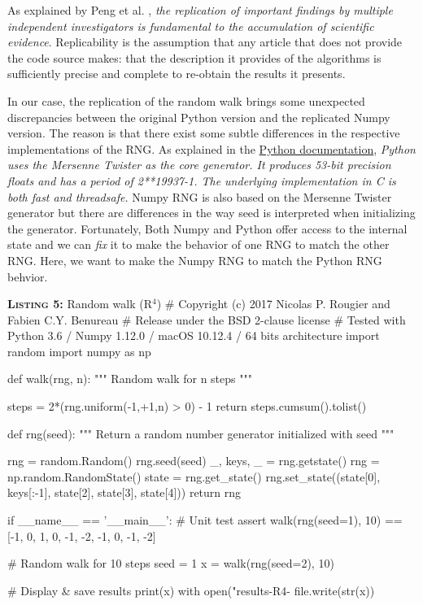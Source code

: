 As explained by Peng et al. \cite{Peng:2006}, {\em the replication of important findings by multiple independent investigators is fundamental to the accumulation of scientific evidence}. Replicability is the assumption that any article that does not provide the code source makes: that the description it provides of the algorithms is sufficiently precise and complete to re-obtain the results it presents.

In our case, the replication of the random walk brings some unexpected discrepancies between the original Python version and the replicated Numpy version.
The reason is that there exist some subtle differences in the respective implementations of the RNG.
As explained in the \href{https://docs.python.org/3.6/library/random.html}{Python documentation}, {\em Python uses the Mersenne Twister as the core generator. It produces 53-bit precision floats
and has a period of 2**19937-1.
The underlying implementation in C is both fast and threadsafe.}
Numpy RNG is also based on the Mersenne Twister generator but there are differences in the way seed is interpreted when initializing the generator.
Fortunately, Both Numpy and Python offer access to the internal state and we can {\em fix} it to make the behavior of one RNG to match the other RNG.
Here, we want to make the Numpy RNG to match the Python RNG behvior.

\begin{code}{\textbf{\textsc{Listing 5:}} Random walk (R$^4$)}
# Copyright (c) 2017 Nicolas P. Rougier and Fabien C.Y. Benureau
# Release under the BSD 2-clause license
# Tested with Python 3.6 / Numpy 1.12.0 / macOS 10.12.4 / 64 bits architecture
import random
import numpy as np

def walk(rng, n):
    """ Random walk for n steps """

    steps = 2*(rng.uniform(-1,+1,n) > 0) - 1
    return steps.cumsum().tolist()

def rng(seed):
    """ Return a random number generator initialized with seed """ 
    
    rng = random.Random()
    rng.seed(seed)
    _, keys, _ = rng.getstate()
    rng = np.random.RandomState()
    state = rng.get_state()
    rng.set_state((state[0], keys[:-1], state[2], state[3], state[4]))
    return rng

if __name__ == '__main__':
    # Unit test
    assert walk(rng(seed=1), 10) == [-1, 0, 1, 0, -1, -2, -1, 0, -1, -2]

    # Random walk for 10 steps
    seed = 1
    x = walk(rng(seed=2), 10)

    # Display & save results
    print(x)
    with open("results-R4-%
        file.write(str(x))
\end{code}

